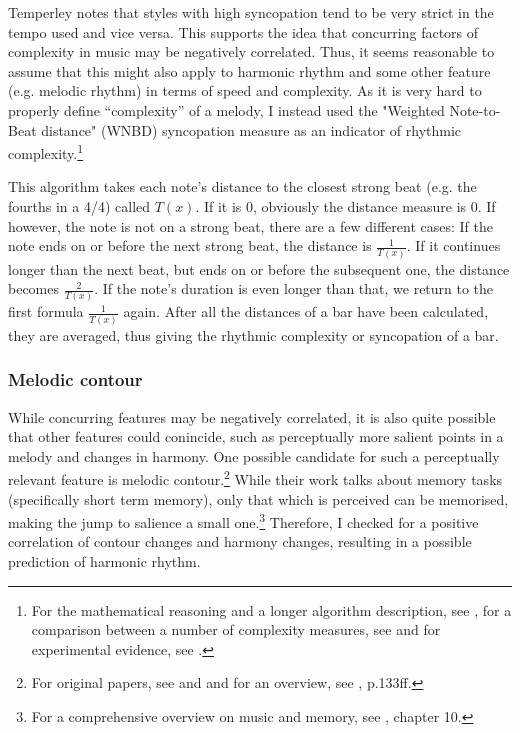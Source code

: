 \documentclass[a4paper,12pt]{report}
\begin{document}
Temperley notes that styles with high syncopation tend to be very strict in the tempo used and vice versa. This supports the idea that concurring factors of complexity in music may be negatively correlated. Thus, it seems reasonable to assume that this might also apply to harmonic rhythm and some other feature (e.g. melodic rhythm) in terms of speed and complexity. As it is very hard to properly define ``complexity'' of a melody, I instead used the "Weighted Note-to-Beat distance" (WNBD) syncopation measure as an indicator of rhythmic complexity.\footnote{For the mathematical reasoning and a longer algorithm description, see \cite{gomez2005mathematical}, for a comparison between a number of complexity measures, see \cite{thul2008rhythm} and for experimental evidence, see \cite{fitch2007perception}.}

This algorithm takes each note's distance to the closest strong beat (e.g. the fourths in a 4/4) called $T(x)$. If it is 0, obviously the distance measure is 0. If however, the note is not on a strong beat, there are a few different cases: If the note ends on or before the next strong beat, the distance is $\frac{1}{T(x)}$. If it continues longer than the next beat, but ends on or before the subsequent one, the distance becomes $\frac{2}{T(x)}$. If the note's duration is even longer than that, we return to the first formula $\frac{1}{T(x)}$ again. After all the distances of a bar have been calculated, they are averaged, thus giving the rhythmic complexity or syncopation of a bar.

\subsubsection{Melodic contour}
While concurring features may be negatively correlated, it is also quite possible that other features could conincide, such as perceptually more salient points in a melody and changes in harmony. One possible candidate for such a perceptually relevant feature is melodic contour.\footnote{For original papers, see \cite{thomassen1982melodic} and \cite{dowling1971contour} and for an overview, see \cite{dowling1986music}, p.133ff.} While their work talks about memory tasks (specifically short term memory), only that which is perceived can be memorised, making the jump to salience a small one.\footnote{For a comprehensive overview on music and memory, see \cite{hallam2011oxford}, chapter 10.} Therefore, I checked for a positive correlation of contour changes and harmony changes, resulting in a possible prediction of harmonic rhythm.
\end{document}
